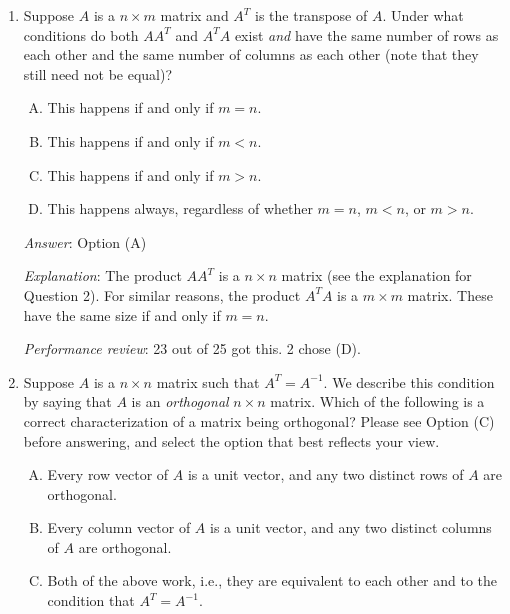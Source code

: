 \documentclass[10pt]{amsart}
\begin{document}
\begin{enumerate}
  {\em Answer}: Option (D)

  {\em Explanation}: $A$ is a $n \times m$ matrix and $A^T$ is a $m
  \times n$ matrix. The product $AA^T$ makes sense because the number
  of columns in $A$ equals the number of rows in $A^T$, so the product
  $AA^T$ is a $n \times n$ matrix.

  {\em Performance review}: All 25 got this correct.

\item Suppose $A$ is a $n \times m$ matrix and $A^T$ is the transpose
  of $A$. Under what conditions do both $AA^T$ and $A^TA$ exist {\em
    and} have the same number of rows as each other and the same
  number of columns as each other (note that they still need not be
  equal)?

  \begin{enumerate}[(A)]
  \item This happens if and only if $m = n$.
  \item This happens if and only if $m < n$.
  \item This happens if and only if $m > n$.
  \item This happens always, regardless of whether $m = n$, $m < n$,
    or $m > n$.
  \end{enumerate} 

  {\em Answer}: Option (A)

  {\em Explanation}: The product $AA^T$ is a $n \times n$ matrix (see
  the explanation for Question 2). For similar reasons, the product
  $A^TA$ is a $m \times m$ matrix. These have the same size if and
  only if $m = n$.

  {\em Performance review}: 23 out of 25 got this. 2 chose (D).

\item Suppose $A$ is a $n \times n$ matrix such that $A^T =
  A^{-1}$. We describe this condition by saying that $A$ is an {\em
    orthogonal} $n \times n$ matrix. Which of the following is a
  correct characterization of a matrix being orthogonal? Please see
  Option (C) before answering, and select the option that best
  reflects your view.

  \begin{enumerate}[(A)]
  \item Every row vector of $A$ is a unit vector, and any two distinct
    rows of $A$ are orthogonal.
  \item Every column vector of $A$ is a unit vector, and any two
    distinct columns of $A$ are orthogonal.
  \item Both of the above work, i.e., they are equivalent to each
    other and to the condition that $A^T = A^{-1}$.
  \end{enumerate}


\end{enumerate}
\end{document}
